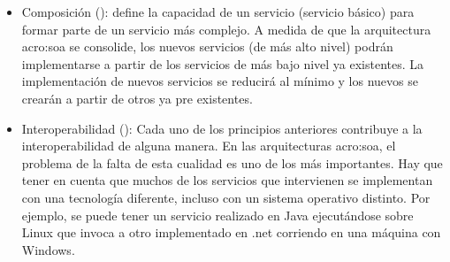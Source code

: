 \begin{itemize}
  \item Composición (): define la capacidad de un servicio (servicio básico) para formar parte de un servicio más complejo. A medida de que la arquitectura \gls{acro:soa} se consolide, los nuevos servicios (de más alto nivel) podrán implementarse a partir de los servicios de más bajo nivel ya existentes. La implementación de nuevos servicios se reducirá al mínimo y los nuevos se crearán a partir de otros ya pre existentes.

  \item Interoperabilidad (): Cada uno de los principios anteriores contribuye a la interoperabilidad de alguna manera. En las arquitecturas \gls{acro:soa}, el problema de la falta de esta cualidad es uno de los más importantes. Hay que tener en cuenta que muchos de los servicios que intervienen se implementan con una tecnología diferente, incluso con un sistema operativo distinto.
  Por ejemplo, se puede tener un servicio realizado en Java ejecutándose sobre Linux que invoca a otro implementado en .net corriendo en una máquina con Windows.

\end{itemize}


